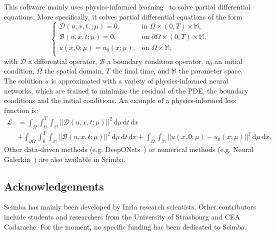 
This software mainly uses physics-informed
learning~\cite{KarKevLuPerWanYan2021}
to solve partial differential equations.
More specifically, it solves partial differential equations of the form
\begin{equation*}
    \begin{cases}
        \mathcal{D}(u, x, t,; \mu) = 0,
         & \text{in } \Omega \times (0,T) \times \mathbb{M},          \\
        \mathcal{B}(u, x, t; \mu) = 0,
         & \text{on } \partial \Omega \times (0,T) \times \mathbb{M}, \\
        u(x, 0; \mu) = u_0(x; \mu),
         & \text{on } \Omega \times \mathbb{M},                       \\
    \end{cases}
\end{equation*}
with $\mathcal{D}$ a differential operator, $\mathcal{B}$ a boundary condition operator,
$u_0$ an initial condition, $\Omega$ the spatial domain,
$T$ the final time, and $\mathbb{M}$ the parameter space.
The solution $u$ is approximated with a variety of physics-informed neural networks,
which are trained to minimize the residual of the PDE,
the boundary conditions and the initial conditions.
An example of a physics-informed loss function is:
\begin{equation*}
    \begin{aligned}
    \mathcal{L} & =
    \int_\Omega \int_0^T \int_{\mathbb{M}}
    ||\mathcal{D}(u, x, t; \mu)||^2 \,
    \mathrm{d}\mu \, \mathrm{d}t \, \mathrm{d}x \\
    & +
    \int_{\partial\Omega} \int_0^T \int_{\mathbb{M}}
    ||\mathcal{B}(u, x, t; \mu)||^2 \,
    \mathrm{d}\mu \, \mathrm{d}t \, \mathrm{d}x
    +
    \int_{\Omega} \int_{\mathbb{M}}
    ||u(x, 0; \mu) - u_0(x;\mu)||^2 \,
    \mathrm{d}\mu \, \mathrm{d}x.
    \end{aligned}
\end{equation*}
Other data-driven methods
(e.g. DeepONets~\cite{LuJinPanZhoKar2021})
or numerical methods
(e.g. Neural Galerkin~\cite{BruPehVan2024})
are also available in Scimba.




\subsection{Acknowledgements}
\label{sec::Scimba:acknowledgements}

Scimba has mainly been developed by Inria research scientists.
Other contributors include students and researchers
from the University of Strasbourg and CEA Cadarache.
For the moment, no specific funding has been dedicated to Scimba.

